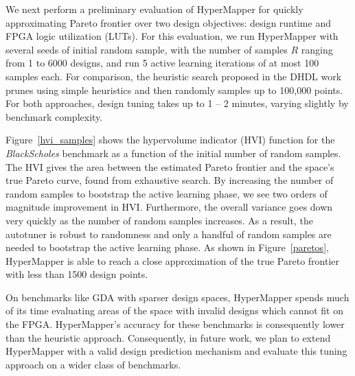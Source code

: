 


We next perform a preliminary evaluation of HyperMapper for quickly approximating Pareto frontier over two design objectives: design runtime and FPGA logic utilization (LUTs).
For this evaluation, we run HyperMapper with several seeds of initial random sample, with the number of samples $R$ ranging from 1 to 6000 designs, and run 5 active learning iterations of at most 100 samples each. For comparison, the heuristic search proposed in the DHDL work~\cite{dhdl} prunes using simple heuristics and then randomly samples up to 100,000 points. For both approaches, design tuning takes up to 1 -- 2 minutes, varying slightly by benchmark complexity.

Figure~\ref{hvi_samples} shows the hypervolume indicator (HVI) function
for the \emph{BlackScholes} benchmark as a function of the initial
number of random samples.
The HVI gives the area between the estimated Pareto frontier and the space's true Pareto curve, found from exhaustive search.
By increasing
the number of random samples to bootstrap the active learning phase,
we see two orders
of magnitude improvement in HVI. Furthermore, the overall variance goes down very
quickly as the number of random
samples increases. As a result, the autotuner is robust
to randomness and only a handful of random samples are
needed to bootstrap the active learning phase. As shown in Figure~\ref{paretos},
HyperMapper is able to reach a close approximation of
the true Pareto frontier with less than 1500 design points.

On benchmarks like GDA with sparser design spaces, HyperMapper spends much of its time evaluating areas 
of the space with invalid designs which cannot fit on the FPGA.
HyperMapper's accuracy for these benchmarks is consequently lower than the heuristic approach.
Consequently, in future work, we plan to extend HyperMapper with a valid design prediction mechanism and evaluate this tuning approach on a wider class of benchmarks.

